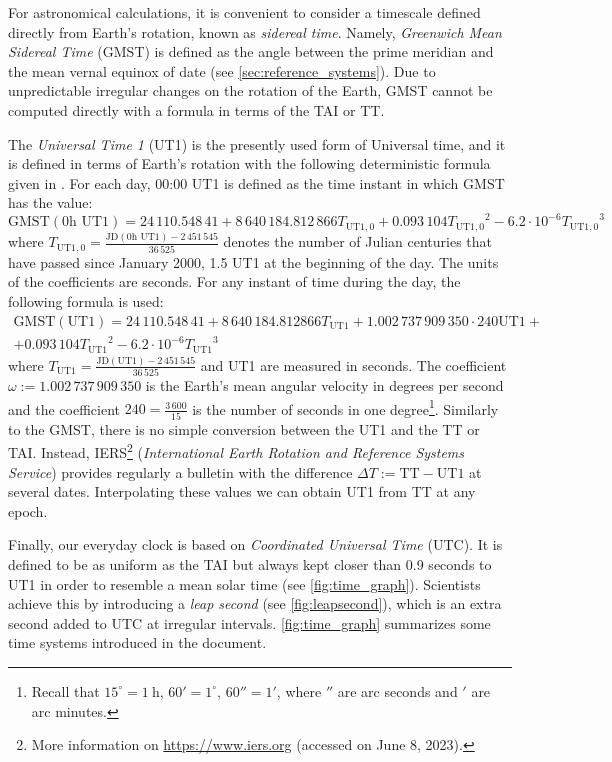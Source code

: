 \documentclass[../main.tex]{subfiles}
\begin{document}
For astronomical calculations, it is convenient to consider a timescale defined directly from Earth's rotation, known as \emph{sidereal time}. Namely, \emph{Greenwich Mean Sidereal Time} (GMST) is defined as the angle between the prime meridian and the mean vernal equinox of date (see \cref{sec:reference_systems}). Due to unpredictable irregular changes on the rotation of the Earth, GMST cannot be computed directly with a formula in terms of the TAI or TT.

The \emph{Universal Time 1} (UT1) is the presently used form of Universal time, and it is defined in terms of Earth's rotation with the following deterministic formula given in \cite{aoki}. For each day, 00:00 UT1 is defined as the time instant in which GMST has the value:
\begin{equation}
  \mathrm{GMST}(0\text{h UT1})=24\,110.548\,41+8\,640\,184.812\,866{T_{\text{UT1},0}}+0.093\,104{T_{\text{UT1},0}}^2-6.2\cdot 10^{-6}{T_{\text{UT1},0}}^3
\end{equation}
where $T_{\text{UT1},0}=\frac{\text{JD}(0\text{h UT1})-2\,451\,545}{36\,525}$ denotes the number of Julian centuries that have passed since January 2000, 1.5 UT1 at the beginning of the day. The units of the coefficients are seconds. For any instant of time during the day, the following formula is used:
\begin{multline}
  \mathrm{GMST}(\mathrm{UT1})=24\,110.548\,41+8\,640\,184.812866{T_{\text{UT1}}}+1.002\,737\,909\,350\cdot240\text{UT1}+\\+0.093\,104{T_{\text{UT1}}}^2-{6.2\cdot 10^{-6}}{T_{\text{UT1}}}^3
\end{multline}
where $T_\text{UT1}=\frac{\text{JD}(\text{UT1})-2\,451\,545}{36\,525}$ and UT1 are measured in seconds. The coefficient $\omega:=1.002\,737\,909\,350$ is the Earth's mean angular velocity in degrees per second and the coefficient $240=\frac{3\,600}{15}$ is the number of seconds in one degree\footnote{Recall that $15^\circ=1\ \text{h}$, $60'=1^\circ$, $60''=1'$, where $''$ are arc seconds and $'$ are arc minutes.}. Similarly to the GMST, there is no simple conversion between the UT1 and the TT or TAI. Instead, IERS\footnote{More information on \href{https://www.iers.org}{https://www.iers.org} (accessed on June 8, 2023).} (\emph{International Earth Rotation and Reference Systems Service}) provides regularly a bulletin with the difference $\Delta T:= \mathrm{TT}-\mathrm{UT1}$ at several dates. Interpolating these values we can obtain UT1 from TT at any epoch.

Finally, our everyday clock is based on \emph{Coordinated Universal Time} (UTC). It is defined to be as uniform as the TAI but always kept closer than 0.9 seconds to UT1 in order to resemble a mean solar time (see \cref{fig:time_graph}). Scientists achieve this by introducing a \emph{leap second} (see \cref{fig:leapsecond}), which is an extra second added to UTC at irregular intervals. \cref{fig:time_graph} summarizes some time systems introduced in the document.
\end{document}
